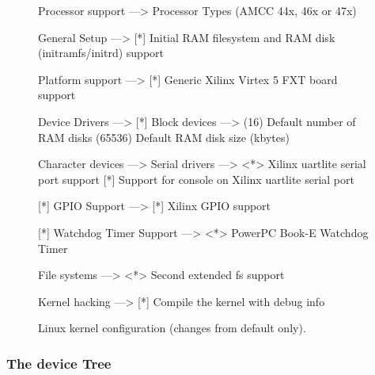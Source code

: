 \begin{figure}[p]
\begin{center}
\begin{script}
Processor support  --->
        Processor Types (AMCC 44x, 46x or 47x)

General Setup  --->
    [*] Initial RAM filesystem and RAM disk (initramfs/initrd) support

Platform support  --->
    [*] Generic Xilinx Virtex 5 FXT board support

Device Drivers  --->
    [*] Block devices  --->
        (16)    Default number of RAM disks
         (65536) Default RAM disk size (kbytes)

        Character devices  --->
            Serial drivers  --->
                <*> Xilinx uartlite serial port support
                [*]   Support for console on Xilinx uartlite serial port

    [*] GPIO Support  --->
        [*] Xilinx GPIO support

    [*] Watchdog Timer Support  --->
        <*> PowerPC Book-E Watchdog Timer

File systems  --->
    <*> Second extended fs support

Kernel hacking  --->
    [*] Compile the kernel with debug info
\end{script}
\end{center}
\caption{Linux kernel configuration (changes from default only).}
\label{fig:kernel_configuration}
\end{figure}

\subsubsection{The device Tree}

